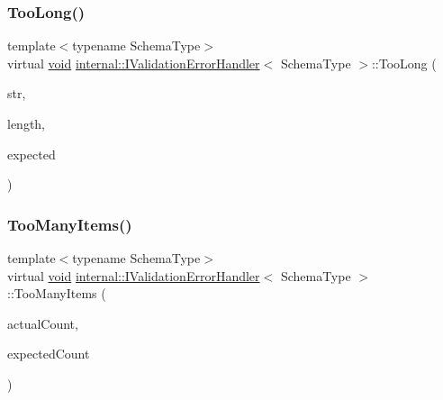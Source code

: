 \subsubsection{\texorpdfstring{Too\+Long()}{TooLong()}}
{\footnotesize\ttfamily template$<$typename Schema\+Type$>$ \\
virtual \hyperlink{imgui__impl__opengl3__loader_8h_ac668e7cffd9e2e9cfee428b9b2f34fa7}{void} \hyperlink{classinternal_1_1IValidationErrorHandler}{internal\+::\+I\+Validation\+Error\+Handler}$<$ Schema\+Type $>$\+::Too\+Long (\begin{DoxyParamCaption}\item[{const \hyperlink{classinternal_1_1IValidationErrorHandler_a22e6a5f35edb9b614156ad606dcc79d7}{Ch} $\ast$}]{str,  }\item[{\hyperlink{rapidjson_8h_a5ed6e6e67250fadbd041127e6386dcb5}{Size\+Type}}]{length,  }\item[{\hyperlink{rapidjson_8h_a5ed6e6e67250fadbd041127e6386dcb5}{Size\+Type}}]{expected }\end{DoxyParamCaption})\hspace{0.3cm}{\ttfamily [pure virtual]}}

\mbox{\label{classinternal_1_1IValidationErrorHandler_a9371ca15622897a429971f69c07c47ef}} 
\subsubsection{\texorpdfstring{Too\+Many\+Items()}{TooManyItems()}}
{\footnotesize\ttfamily template$<$typename Schema\+Type$>$ \\
virtual \hyperlink{imgui__impl__opengl3__loader_8h_ac668e7cffd9e2e9cfee428b9b2f34fa7}{void} \hyperlink{classinternal_1_1IValidationErrorHandler}{internal\+::\+I\+Validation\+Error\+Handler}$<$ Schema\+Type $>$\+::Too\+Many\+Items (\begin{DoxyParamCaption}\item[{\hyperlink{rapidjson_8h_a5ed6e6e67250fadbd041127e6386dcb5}{Size\+Type}}]{actual\+Count,  }\item[{\hyperlink{rapidjson_8h_a5ed6e6e67250fadbd041127e6386dcb5}{Size\+Type}}]{expected\+Count }\end{DoxyParamCaption})\hspace{0.3cm}{\ttfamily [pure virtual]}}



